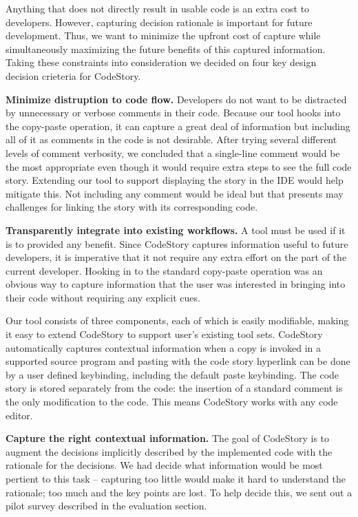 \documentclass[../manifest.tex]{subfiles}
\begin{document}
Anything that does not directly result in usable code is an extra cost to developers. However, capturing decision rationale is important for future development. Thus, we want to minimize the upfront cost of capture while simultaneously maximizing the future benefits of this captured information. Taking these constraints into consideration we decided on four key design decision crieteria for CodeStory.

\textbf{Minimize distruption to code flow.} Developers do not want to be distracted by unnecessary or verbose comments in their code. Because our tool hooks into the copy-paste operation, it can capture a great deal of information but including all of it as comments in the code is not desirable. After trying several different levels of comment verbosity, we concluded that a single-line comment would be the most appropriate even though it would require extra steps to see the full code story. Extending our tool to support displaying the story in the IDE would help mitigate this. Not including any comment would be ideal but that presents may challenges for linking the story with its corresponding code.

\textbf{Transparently integrate into existing workflows.} A tool must be used if it is to provided any benefit. Since CodeStory captures information useful to future developers, it is imperative that it not require any extra effort on the part of the current developer. Hooking in to the standard copy-paste operation was an obvious way to capture information that the user was interested in bringing into their code without requiring any explicit cues.

Our tool consists of three components, each of which is easily modifiable, making it easy to extend CodeStory to support user's existing tool sets. CodeStory automatically captures contextual information when a copy is invoked in a supported source program and pasting with the code story hyperlink can be done by a user defined keybinding, including the default paste keybinding. The code story is stored separately from the code: the insertion of a standard comment is the only modification to the code. This means CodeStory works with any code editor.

\textbf{Capture the right contextual information.} The goal of CodeStory is to augment the decisions implicitly described by the implemented code with the rationale for the decisions. We had decide what information would be most pertient to this task -- capturing too little would make it hard to understand the rationale; too much and the key points are lost. To help decide this, we sent out a pilot survey described in the evaluation section.
\end{document}
